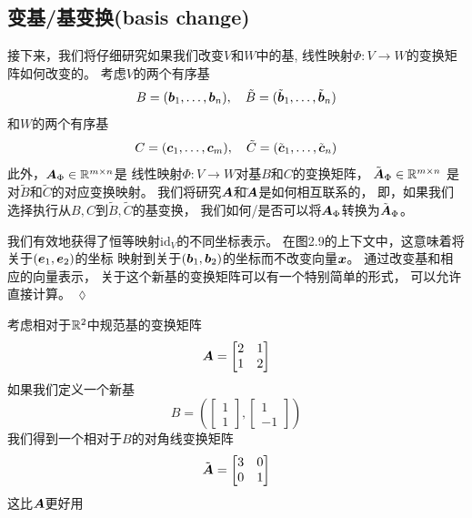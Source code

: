 \subsection{变基/基变换(basis change)}

接下来，我们将仔细研究如果我们改变$V$和$W$中的基,
线性映射$\Phi:V \rightarrow W$的变换矩阵如何改变的。
考虑$V$的两个有序基
\begin{equation}
    B = (\boldsymbol{b}_1,\dots,\boldsymbol{b}_n),\quad
    \tilde{B} = (\tilde{\boldsymbol{b}}_1,\dots,\tilde{\boldsymbol{b}}_n)
\end{equation}
和$W$的两个有序基
\begin{equation}
    C = (\boldsymbol{c}_1,\dots,\boldsymbol{c}_m),\quad
    \tilde{C} = (\tilde{\boldsymbol{c}}_1,\dots,\tilde{\boldsymbol{c}}_n)
\end{equation}
此外，$\boldsymbol{A}_\Phi \in \mathbb{R}^{m \times n}$是
线性映射$\Phi:V \rightarrow W$对基$B$和$C$的变换矩阵，
$\tilde{\boldsymbol{A}}_\Phi \in \mathbb{R}^{m \times n}$
是对$\tilde{B}$和$\tilde{C}$的对应变换映射。
我们将研究$\boldsymbol{A}$和$\tilde{}{\boldsymbol{A}}$是如何相互联系的，
即，如果我们选择执行从$B, C$到$\tilde{B}, \tilde{C}$的基变换，
我们如何/是否可以将$\boldsymbol{A}_\Phi$转换为$\tilde{\boldsymbol{A}}_\Phi$。
\begin{remark}
    我们有效地获得了恒等映射$\mathrm{id}_V$的不同坐标表示。
    在图2.9的上下文中，这意味着将关于$(\boldsymbol{e}_1,\boldsymbol{e}_2)$的坐标
    映射到关于$(\boldsymbol{b}_1, \boldsymbol{b}_2)$的坐标而不改变向量$\boldsymbol{x}$。
    通过改变基和相应的向量表示，
    关于这个新基的变换矩阵可以有一个特别简单的形式，
    可以允许直接计算。 \hfill $\lozenge$
\end{remark}

\begin{example}[基变换]
    考虑相对于$\mathbb{R}^2$中规范基的变换矩阵
    \begin{equation}
            \boldsymbol{A} =
        \begin{bmatrix}
            2 & 1 \\ 1 & 2
        \end{bmatrix}
    \end{equation}
    如果我们定义一个新基
    \begin{equation}
        B =(
        \begin{bmatrix} 1 \\ 1 \end{bmatrix},
        \begin{bmatrix} 1 \\ -1 \end{bmatrix}
        )
    \end{equation}
    我们得到一个相对于$B$的对角线变换矩阵
    \begin{equation}
        \tilde{\boldsymbol{A}}=
        \begin{bmatrix}
            3 & 0 \\ 0 & 1
        \end{bmatrix}
    \end{equation}
    这比$\boldsymbol{A}$更好用
\end{example}

